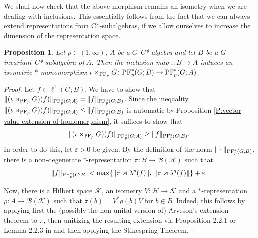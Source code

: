 \documentclass[12pt]{amsart}
\newtheorem{prop}[thm]{Proposition}
\theoremstyle{definition}
\theoremstyle{remark}
\numberwithin{equation}{section}
\newcommand{\cpf}{\rtimes_{\textup{PF}_p} G}
\newcommand{\mc}{\mathcal}
\begin{document}
We shall now check that the above morphism remains an isometry when we are dealing with  inclusions. This essentially follows from the fact that we can always extend representations from  C*-subalgebras, if we allow ourselves to increase the dimension of the representation space.

\begin{prop}\label{cp:cp:hereAlgPf}
	Let $p\in (1,\infty)$, $A$ be a $G$-C*-algebra and let $B$ be a $G$-invariant
 C*-subalgebra of $A$.
	Then the inclusion map $\iota\colon B \to A$ induces an isometric $*$-monomorphism
	$\iota \cpf\colon \textup{PF}_p^*(G;B) \to \textup{PF}_p^*(G;A)$.
\end{prop}

\begin{proof}
	Let $f\in \ell^1(G; B)$. We have to show that
	$\|(\iota\cpf)(f)\|_{\textup{PF}_p^*(G;A)} = \|f\|_{\textup{PF}_p^*(G;B)}$. Since the inequality
	$\|(\iota\cpf)(f)\|_{\textup{PF}_p^*(G;A)} \leq \|f\|_{\textup{PF}_p^*(G;B)}$ is automatic by Proposition \ref{P:vector value extension of homomorphism},
	it suffices to show that
	\[
	\|(\iota\cpf)(f)\|_{\textup{PF}_p^*(G;A)} \geq \|f\|_{\textup{PF}_p^*(G;B)}.\]
	In order to do this, let
	$\varepsilon>0$ be given.
	By the definition of the norm $\|\cdot\|_{\textup{PF}^*_p(G;B)}$, there is a non-degenerate $*$-representation $\pi\colon B\to \mathcal{B}(\mathcal{H})$
	such that
	$$\| f\|_{\textup{PF}^*_p(G;B)}< \max \lbrace \|\tilde{\pi}\rtimes \lambda^p(f)\|,
	\, \|\tilde{\pi}\rtimes \lambda^q(f)\|\rbrace + \varepsilon.$$
	
Now, there is a Hilbert space $\mc{K}$, an isometry $V\colon \mc{H}\rightarrow \mc{K}$ and a $*$-representation $\rho\colon A\to \mathcal{B}(\mathcal{K})$ such that
	$\pi(b) = V^*\rho(b) V$ for $b\in B$. Indeed, this follows by applying first the (possibly the non-unital version of) Arveson's extension theorem to $\pi$, then unitizing the resulting extension via Proposition 2.2.1 or Lemma 2.2.3 in \cite{BO} and then applying the Stinespring Theorem.


\end{proof}
\end{document}
